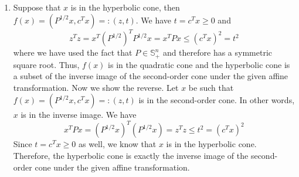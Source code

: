 \documentclass[11pt]{amsart}
\begin{document}
\begin{enumerate}
\vspace{0.5in}


\item Suppose that $x$ is in the hyperbolic cone, then $f(x) = (P^{1/2}x, c^Tx) =: (z,t)$.  We have $t = c^Tx \ge 0$ and
\[
z^Tz = x^T (P^{1/2})^TP^{1/2}x = x^T P x\le (c^T x)^2 = t^2
\]
where we have used the fact that $P \in \mathbb{S}^n_+$ and therefore has a symmetric square root.  Thus, $f(x)$ is in the quadratic cone and the hyperbolic cone is a subset of the inverse image of the second-order cone under the given affine transformation.  Now we show the reverse.  Let $x$ be such that $f(x) = (P^{1/2}x, c^Tx) =: (z,t)$ is in the second-order cone.  In other words, $x$ is in the inverse image.  We have
\[
x^T P x = (P^{1/2}x)^T(P^{1/2}x) = z^Tz \le t^2 = (c^Tx)^2
\]
Since $t = c^Tx \ge 0$ as well, we know that $x$ is in the hyperbolic cone.  Therefore, the hyperbolic cone is exactly the inverse image of the second-order cone under the given affine transformation. 








\end{enumerate}
\end{document}
